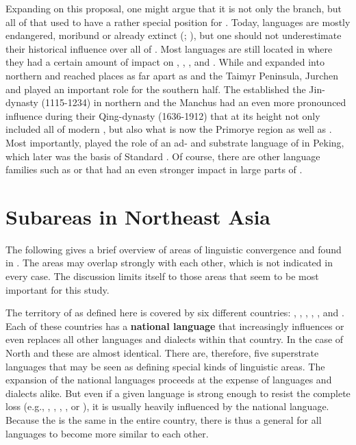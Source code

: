 \noindent Expanding on this proposal, one might argue that it is not only the  branch, but all of  that used to have a rather special position for . Today,  languages are mostly endangered, moribund or already extinct (\citealt{Janhunen2005}; \citealt{TsumagariKurebitoEndo2007}), but one should not underestimate their historical influence over all of . Most  languages are still located in  where they had a certain amount of impact on , , , and . While  and  expanded into northern  and reached places as far apart as  and the Taimyr Peninsula, Jurchen and  played an important role for the southern half. The  established the Jin-dynasty (1115-1234) in northern  and the Manchus had an even more pronounced influence during their Qing-dynasty (1636-1912) that at its height not only included all of modern , but also what is now the  Primorye region as well as . Most importantly,  played the role of an ad- and substrate language of  in Peking, which later was the basis of Standard . Of course, there are other language families such as  or  that had an even stronger impact in large parts of .

\section{Subareas in Northeast Asia}\label{sec:3.5}

The following gives a brief overview of areas of linguistic convergence and  found in . The areas may overlap strongly with each other, which is not indicated in every case. The discussion limits itself to those areas that seem to be most important for this study.

The territory of  as defined here is covered by six different countries: , , , , , and . Each of these countries has a \textbf{national language} that increasingly influences or even replaces all other languages and dialects within that country. In the case of North and  these are almost identical. There are, therefore, five superstrate languages that may be seen as defining special kinds of linguistic areas. The expansion of the national languages proceeds at the expense of languages and dialects alike. But even if a given language is strong enough to resist the complete loss (e.g., , , , , or ), it is usually heavily influenced by the national language. Because the  is the same in the entire country, there is thus a general  for all languages to become more similar to each other.

